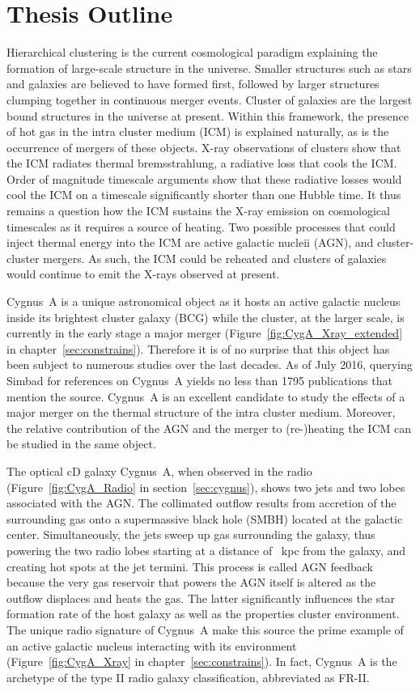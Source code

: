 \documentclass[MScProj_TLRH_ClusterEnergy.tex]{subfiles}
\begin{document}
\chapter*{Thesis Outline}
\label{sec:outline}
Hierarchical clustering is the current cosmological paradigm explaining the
formation of large-scale structure in the universe. Smaller structures such as 
stars and galaxies are believed to have formed first, followed by larger 
structures clumping together in continuous merger events. Cluster of galaxies 
are the largest bound structures in the universe at present. Within this 
framework, the presence of hot gas in the intra cluster medium (ICM) is 
explained naturally, as is the occurrence of mergers of these objects. X-ray 
observations of clusters show that the ICM radiates thermal bremsstrahlung, a 
radiative loss that cools the ICM. Order of magnitude timescale arguments show 
that these radiative losses would cool the ICM on a timescale significantly 
shorter than one Hubble time. It thus remains a question how the ICM sustains 
the X-ray emission on cosmological timescales as it requires a source of heating.
Two possible processes that could inject thermal energy into the ICM are active
galactic nucleii (AGN), and cluster-cluster mergers. As such, the ICM could be
reheated and clusters of galaxies would continue to emit the X-rays observed at
present.

Cygnus~A is a unique astronomical object as it hosts an active galactic nucleus
inside its brightest cluster galaxy (BCG) while the cluster, at the larger scale, is 
currently in the early stage a major merger (Figure~\ref{fig:CygA_Xray_extended}
in chapter~\ref{sec:constrains}). Therefore it is of no surprise that this object 
has been subject to numerous studies over the last decades. As of July 2016, 
querying Simbad for references on Cygnus~A yields no less than 1795 publications
that mention the source. Cygnus~A is an excellent candidate to study the effects
of a major merger on the thermal structure of the intra cluster medium. Moreover,
the relative contribution of the AGN and the merger to (re-)heating the ICM can be 
studied in the same object.

The optical cD galaxy Cygnus~A, when observed in the radio (Figure~\ref{fig:CygA_Radio}
in section~\ref{sec:cygnus}), shows two jets and two lobes associated with the AGN.
The collimated outflow results from accretion of the surrounding gas onto a 
supermassive black hole (SMBH) located at the galactic center. Simultaneously, 
the jets sweep up gas surrounding the galaxy, thus powering the two radio lobes 
starting at a distance of ~kpc from the galaxy, and creating hot spots 
at the jet termini. This process is called AGN feedback because the very gas 
reservoir that powers the AGN itself is altered as the outflow displaces and 
heats the gas. The latter significantly influences the star formation rate of the
host galaxy as well as the properties cluster environment. The unique radio 
signature of Cygnus~A make this source the prime example of an active galactic 
nucleus interacting with its environment (Figure~\ref{fig:CygA_Xray} in 
chapter~\ref{sec:constrains}). In fact, Cygnus~A is the archetype of the
\citet{1974MNRAS.167P..31F} type II radio galaxy classification, abbreviated as FR-II.
\end{document}
